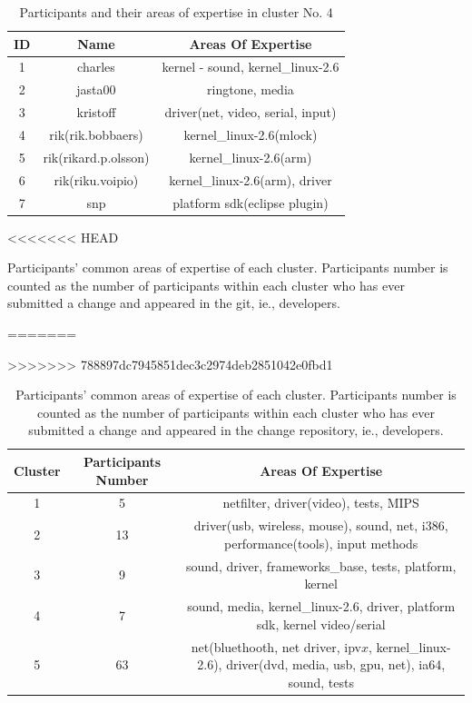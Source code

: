\documentclass[conference]{IEEEtran}
\begin{document}
\begin{table}[!t]
\renewcommand{\arraystretch}{1.3}
\caption{Participants and their areas of expertise in cluster No. 4}
\label{cluster_no4}
\centering
\begin{tabular}{|c|c|c|}
\hline
ID & Name & Areas Of Expertise \\
\hline
1 & charles & kernel - sound, kernel\_linux-2.6 \\
\hline
2 & jasta00 & ringtone, media \\
\hline
3 & kristoff & driver(net, video, serial, input) \\
\hline
4 & rik(rik.bobbaers) & kernel\_linux-2.6(mlock) \\
\hline
5 & rik(rikard.p.olsson) & kernel\_linux-2.6(arm) \\
\hline
6 & rik(riku.voipio) & kernel\_linux-2.6(arm), driver \\
\hline
7 & snp & platform sdk(eclipse plugin) \\
\hline
\end{tabular}
\end{table}

\begin{table}[!t]
<<<<<<< HEAD
\caption{Participants' common areas of expertise of each cluster. Participants number is counted as the number of participants within each cluster who has ever submitted a change and appeared in the git, ie., developers.}
=======
\caption{Participants' common areas of expertise of each cluster. Participants number is counted as the number of participants within each cluster who has ever submitted a change and appeared in the change repository, ie., developers.}
>>>>>>> 788897dc7945851dec3c2974deb2851042e0fbd1
\label{cluster_topic}
\centering
\begin{tabular}{|c|c|c|}
\hline
Cluster & Participants Number & Areas Of Expertise \\
\hline
1 & 5 & netfilter, driver(video), tests, MIPS \\
\hline
2 & 13 & driver(usb, wireless, mouse), sound, net, i386, performance(tools), input methods \\
\hline
3 & 9 & sound, driver, frameworks\_base, tests, platform, kernel \\
\hline
4 & 7 & sound, media, kernel\_linux-2.6, driver, platform sdk, kernel video/serial \\
\hline
5 & 63 & net(bluethooth, net driver, ipv$x$, kernel\_linux-2.6), driver(dvd, media, usb, gpu, net), ia64, sound, tests \\
\hline
\end{tabular}
\end{table}
\end{document}
